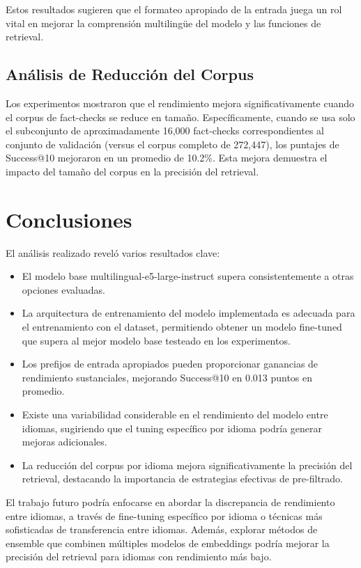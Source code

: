 \documentclass[a4paper,openany]{memoir}
\begin{document}
Estos resultados sugieren que el formateo apropiado de la entrada juega un rol vital en mejorar la comprensión multilingüe del modelo y las funciones de retrieval.

\section{Análisis de Reducción del Corpus}

Los experimentos mostraron que el rendimiento mejora significativamente cuando el corpus de fact-checks se reduce en tamaño. Específicamente, cuando se usa solo el subconjunto de aproximadamente 16,000 fact-checks correspondientes al conjunto de validación (versus el corpus completo de 272,447), los puntajes de Success@10 mejoraron en un promedio de 10.2\%. Esta mejora demuestra el impacto del tamaño del corpus en la precisión del retrieval.

\chapter{Conclusiones}

El análisis realizado reveló varios resultados clave:

\begin{itemize}
    \item El modelo base multilingual-e5-large-instruct supera consistentemente a otras opciones evaluadas.
    \item La arquitectura de entrenamiento del modelo implementada es adecuada para el entrenamiento con el dataset, permitiendo obtener un modelo fine-tuned que supera al mejor modelo base testeado en los experimentos.
    \item Los prefijos de entrada apropiados pueden proporcionar ganancias de rendimiento sustanciales, mejorando Success@10 en 0.013 puntos en promedio.
    \item Existe una variabilidad considerable en el rendimiento del modelo entre idiomas, sugiriendo que el tuning específico por idioma podría generar mejoras adicionales.
    \item La reducción del corpus por idioma mejora significativamente la precisión del retrieval, destacando la importancia de estrategias efectivas de pre-filtrado.
\end{itemize}

El trabajo futuro podría enfocarse en abordar la discrepancia de rendimiento entre idiomas, a través de fine-tuning específico por idioma o técnicas más sofisticadas de transferencia entre idiomas. Además, explorar métodos de ensemble que combinen múltiples modelos de embeddings podría mejorar la precisión del retrieval para idiomas con rendimiento más bajo.
\end{document}
